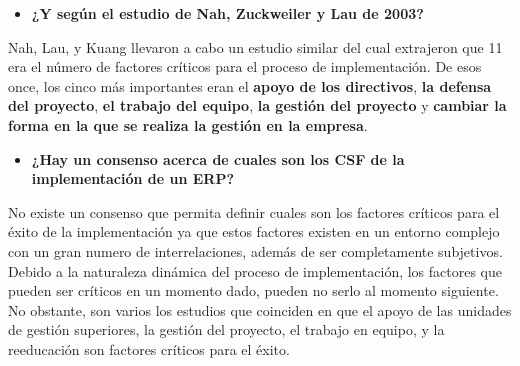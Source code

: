 \documentclass[11pt,a4paper]{article}
\begin{document}
\begin{itemize}
\item \textbf{¿Y según el estudio de Nah, Zuckweiler y Lau de 2003?}
\end{itemize}
Nah, Lau, y Kuang llevaron a cabo un estudio similar del cual extrajeron que 11 era el número de factores críticos para el proceso de implementación. De esos once, los cinco más importantes eran el \textbf{apoyo de los directivos}, \textbf{la defensa del proyecto}, \textbf{el trabajo del equipo}, \textbf{la gestión del proyecto} y  \textbf{cambiar la forma en la que se realiza la gestión en la empresa}.
\begin{itemize}
\item \textbf{¿Hay un consenso acerca de cuales son los CSF de la implementación de un ERP?}
\end{itemize}
No existe un consenso que permita definir cuales son los factores críticos para el éxito de la implementación ya que estos factores existen en un entorno complejo con un gran numero de interrelaciones, además de ser completamente subjetivos. Debido a la naturaleza dinámica del proceso de implementación, los factores que pueden ser críticos en un momento dado, pueden no serlo al momento siguiente. No obstante, son varios los estudios que coinciden en que el apoyo de las unidades de gestión superiores, la gestión del proyecto, el trabajo en equipo, y la reeducación son factores críticos para el éxito.
\end{document}
